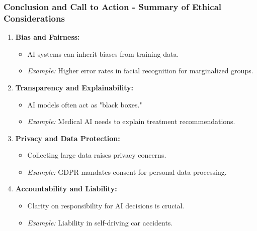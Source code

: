 \documentclass[aspectratio=169]{beamer}
\begin{document}
\begin{frame}[fragile]
    \frametitle{Conclusion and Call to Action - Summary of Ethical Considerations}
    
    \begin{enumerate}
        \item \textbf{Bias and Fairness:}
        \begin{itemize}
            \item AI systems can inherit biases from training data.
            \item \textit{Example:} Higher error rates in facial recognition for marginalized groups.
        \end{itemize}
        
        \item \textbf{Transparency and Explainability:}
        \begin{itemize}
            \item AI models often act as "black boxes."
            \item \textit{Example:} Medical AI needs to explain treatment recommendations.
        \end{itemize}
        
        \item \textbf{Privacy and Data Protection:}
        \begin{itemize}
            \item Collecting large data raises privacy concerns.
            \item \textit{Example:} GDPR mandates consent for personal data processing.
        \end{itemize}
        
        \item \textbf{Accountability and Liability:}
        \begin{itemize}
            \item Clarity on responsibility for AI decisions is crucial.
            \item \textit{Example:} Liability in self-driving car accidents.
        \end{itemize}
    \end{enumerate}
\end{frame}
\end{document}
